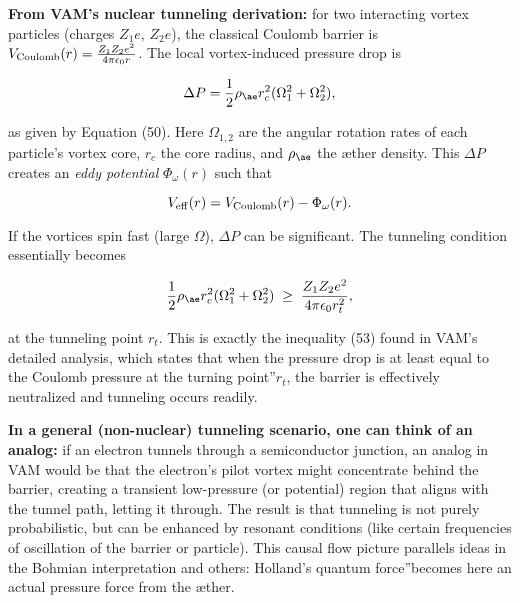 \documentclass[a4paper, aps,preprint,superscriptaddress, 12pt]{revtex4}
\begin{document}
\textbf{From VAM's nuclear tunneling derivation:} for two interacting vortex particles (charges $Z_1e$, $Z_2e$), the classical Coulomb barrier is $V_{\rm Coulomb}(r) = \frac{Z_1 Z_2 e^2}{4\pi\epsilon_0 r}$. The local vortex-induced pressure drop is

\begin{equation}
    \Delta P = \frac{1}{2}\rho_{\ae} r_c^2 (\Omega_1^2 + \Omega_2^2),
\end{equation}

as given by Equation (50). Here $\Omega_{1,2}$ are the angular rotation rates of each particle's vortex core, $r_c$ the core radius, and $\rho_{\ae}$ the æther density. This $\Delta P$ creates an \textit{eddy potential} $\Phi_\omega(r)$ such that

\begin{equation}
    V_{\rm eff}(r) = V_{\rm Coulomb}(r) - \Phi_\omega(r).
\end{equation}

If the vortices spin fast (large $\Omega$), $\Delta P$ can be significant. The tunneling condition essentially becomes

\begin{equation}
    \frac{1}{2}\rho_{\ae} r_c^2 (\Omega_1^2 + \Omega_2^2) \;\ge\; \frac{Z_1 Z_2 e^2}{4\pi\epsilon_0 r_t^2},
\end{equation}

at the tunneling point $r_t$. This is exactly the inequality (53) found in VAM's detailed analysis, which states that when the pressure drop is at least equal to the Coulomb pressure at the \grqq turning point\textquotedblright $r_t$, the barrier is effectively neutralized and tunneling occurs readily.


\textbf{In a general (non-nuclear) tunneling scenario, one can think of an analog:} if an electron tunnels through a semiconductor junction, an analog in VAM would be that the electron's pilot vortex might concentrate behind the barrier, creating a transient low-pressure (or potential) region that aligns with the tunnel path, letting it through. The result is that tunneling is not purely probabilistic, but can be enhanced by resonant conditions (like certain frequencies of oscillation of the barrier or particle). This causal flow picture parallels ideas in the Bohmian interpretation and others: Holland's \grqq quantum force\textquotedblright becomes here an actual pressure force from the æther.
\end{document}
